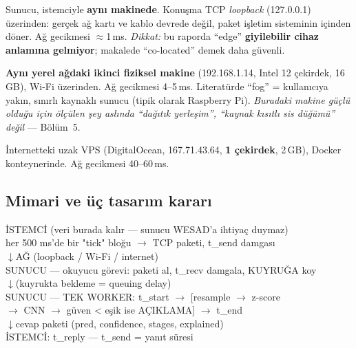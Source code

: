 \documentclass[11pt,a4paper]{article}
\newcommand{\ms}{\,ms}
\begin{document}
\begin{tanim}
\begin{description}[leftmargin=0pt,style=nextline,itemsep=0.3em]
\item[Uç / ortak yerleşim (edge, co-located)] Sunucu, istemciyle
\textbf{aynı makinede}. Konuşma TCP \emph{loopback} (127.0.0.1) üzerinden:
gerçek ağ kartı ve kablo devrede değil, paket işletim sisteminin içinden döner.
Ağ gecikmesi $\approx$1\ms. \emph{Dikkat:} bu raporda ``edge'' \textbf{giyilebilir
cihaz anlamına gelmiyor}; makalede ``co-located'' demek daha güvenli.

\item[Sis (fog)] \textbf{Aynı yerel ağdaki ikinci fiziksel makine}
(192.168.1.14, Intel 12 çekirdek, 16\,GB), Wi-Fi üzerinden. Ağ gecikmesi
4--5\ms. Literatürde ``fog'' = kullanıcıya yakın, sınırlı kaynaklı sunucu
(tipik olarak Raspberry Pi). \emph{Buradaki makine güçlü olduğu için ölçülen
şey aslında ``dağıtık yerleşim'', ``kaynak kısıtlı sis düğümü'' değil} ---
Bölüm~5.

\item[Bulut (cloud)] İnternetteki uzak VPS (DigitalOcean, 167.71.43.64,
\textbf{1 çekirdek}, 2\,GB), Docker konteynerinde. Ağ gecikmesi 40--60\ms.
\end{description}
\end{tanim}

\subsection{Mimari ve üç tasarım kararı}

\begin{tcolorbox}[colback=acikGri,colframe=black!30,boxrule=0.6pt]
\ttfamily\footnotesize
İSTEMCİ (veri burada kalır --- sunucu WESAD'a ihtiyaç duymaz)\\
\hspace*{1em}her 500 ms'de bir "tick" bloğu $\rightarrow$ TCP paketi, t\_send damgası\\
\hspace*{2em}$\downarrow$\quad AĞ (loopback / Wi-Fi / internet)\\
SUNUCU — okuyucu görevi: paketi al, t\_recv damgala, KUYRUĞA koy\\
\hspace*{2em}$\downarrow$\quad (kuyrukta bekleme = queuing delay)\\
SUNUCU — TEK WORKER: t\_start $\rightarrow$ [resample $\rightarrow$ z-score\\
\hspace*{6em}$\rightarrow$ CNN $\rightarrow$ güven < eşik ise AÇIKLAMA] $\rightarrow$ t\_end\\
\hspace*{2em}$\downarrow$\quad cevap paketi (pred, confidence, stages, explained)\\
İSTEMCİ: t\_reply — t\_send = yanıt süresi
\end{tcolorbox}
\end{document}
